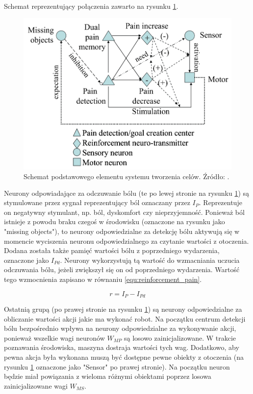Schemat reprezentujący połączenia zawarto na rysunku 
\ref{fig:goalcreationsystemunit}.

\begin{figure}[H]
	\centering
	\includegraphics[width=0.7\linewidth]{rozdzial2/images/goal_creation_system_unit}
	\caption{Schemat podstawowego elementu systemu tworzenia celów. Źródło: 
	\cite{motivation_in_ei}.}
	\label{fig:goalcreationsystemunit}
\end{figure}

Neurony odpowiadające za odczuwanie bólu (te po lewej stronie na rysunku 
\ref{fig:goalcreationsystemunit}) są stymulowane przez sygnał reprezentujący 
ból oznaczany przez $I_P$. Reprezentuje on negatywny stymulant, np. ból, 
dyskomfort czy nieprzyjemność. Ponieważ ból istnieje z powodu braku czegoś w 
środowisku (oznaczone na rysunku jako "missing objects"), to neurony 
odpowiedzialne za detekcję bólu aktywują się w momencie wyciszenia neuronu 
odpowiedzialnego za czytanie wartości z otoczenia. Dodana została także pamięć 
wartości bólu z poprzedniego wydarzenia, oznaczone jako $I_{Pd}$. Neurony 
wykorzystują tą wartość do wzmacniania uczucia odczuwania bólu, jeżeli 
zwiększył się on od poprzedniego wydarzenia. Wartość tego wzmocnienia zapisano 
w równaniu \ref{equ:reinforcement_pain}.

\begin{equation}
	\label{equ:reinforcement_pain}
	r = I_P - I_{Pd}
\end{equation}

Ostatnią grupą (po prawej stronie na rysunku \ref{fig:goalcreationsystemunit}) 
są neurony odpowiedzialne za obliczanie wartości akcji jakie ma wykonać robot. 
Na początku centrum detekcji bólu bezpośrednio wpływa na neurony odpowiedzialne 
za wykonywanie akcji, ponieważ wszelkie wagi neuronów $W_{MP}$ są losowo 
zainicjalizowane. W trakcie poznawania środowiska, maszyna dostraja wartości 
tych wag. Dodatkowo, aby pewna akcja była wykonana muszą być dostępne pewne 
obiekty z otoczenia (na rysunku \ref{fig:goalcreationsystemunit} oznaczone jako 
"Sensor" po prawej stronie). Na początku neuron będzie miał powiązania z 
wieloma różnymi obiektami poprzez losowa zainicjalizowane wagi $W_{MS}$.

